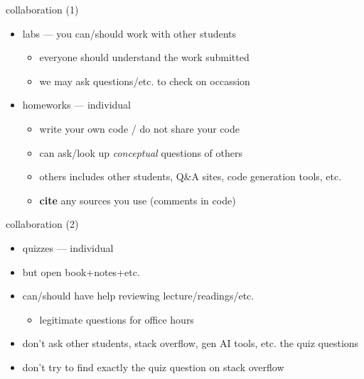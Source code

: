 \begin{frame}{collaboration (1)}
    \begin{itemize}
    \item labs --- you can/should work with other students
        \begin{itemize}
        \item everyone should understand the work submitted
        \item we may ask questions/etc. to check on occassion
        \end{itemize}
    \item homeworks --- individual
        \begin{itemize}
        \item write your own code / do not share your code
        \item can ask/look up \textit{conceptual} questions of others
        \item others includes other students, Q\&A sites, code generation tools, etc.
        \item \textbf{cite} any sources you use (comments in code)
        \end{itemize}
    \end{itemize}
\end{frame}

\begin{frame}{collaboration (2)}
    \begin{itemize}
    \item quizzes --- individual
    \vspace{.5cm}
    \item but open book+notes+etc.
    \item can/should have help reviewing lecture/readings/etc.
        \begin{itemize}
        \item legitimate questions for office hours
        \end{itemize}
    \item don't ask other students, stack overflow, gen AI tools, etc. the quiz questions
    \item don't try to find exactly the quiz question on stack overflow
    \end{itemize}
\end{frame}
